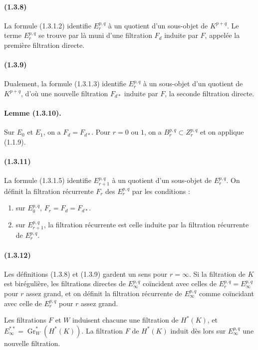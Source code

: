 \documentclass[10pt]{article}
\newcommand{\Gr}{\operatorname{Gr}}
\begin{document}
\paragraph{(1.3.8)} La formule (1.3.1.2) identifie $E_r^{p,q}$ à un quotient d'un sous-objet de $K^{p+q}$. Le terme $E_r^{p,q}$ se trouve par là muni d'une filtration $F_d$ induite par $F$, appelée la première filtration directe.

\paragraph{(1.3.9)} Dualement, la formule (1.3.1.3) identifie $E_r^{p,q}$ à un sous-objet d'un quotient de $K^{p+q}$, d'où une nouvelle filtration $F_{d*}$ induite par $F$, la seconde filtration directe.

\paragraph{Lemme (1.3.10).} Sur $E_0$ et $E_1$, on a $F_d=F_{d*}$. Pour $r=0$ ou $1$, on a $B_r^{p,q}\subset Z_r^{p,q}$ et on applique (1.1.9).

\paragraph{(1.3.11)} La formule (1.3.1.5) identifie $E_{r+1}^{p,q}$ à un quotient d'un sous-objet de $E_r^{p,q}$. On définit la filtration récurrente $F_r$ des $E_r^{p,q}$ par les conditions :
\begin{enumerate}[label=(\roman*)]
\item sur $E_0^{p,q}$, $F_r=F_d=F_{d*}$.
\item sur $E_{r+1}^{p,q}$, la filtration récurrente est celle induite par la filtration récurrente de $E_r^{p,q}$.
\end{enumerate}

\paragraph{(1.3.12)} Les définitions (1.3.8) et (1.3.9) gardent un sens pour $r=\infty$. Si la filtration de $K$ est birégulière, les filtrations directes de $E_\infty^{p,q}$ coïncident avec celles de $E_r^{p,q}=E_\infty^{p,q}$ pour $r$ assez grand, et on définit la filtration récurrente de $E_\infty^{p,q}$ comme coïncidant avec celle de $E_r^{p,q}$ pour $r$ assez grand.

Les filtrations $F$ et $W$ induisent chacune une filtration de $H^*(K)$, et $E_\infty^{**}=\Gr_W^*(H^*(K))$. La filtration $F$ de $H^*(K)$ induit dès lors sur $E_\infty^{p,q}$ une nouvelle filtration.
\end{document}
